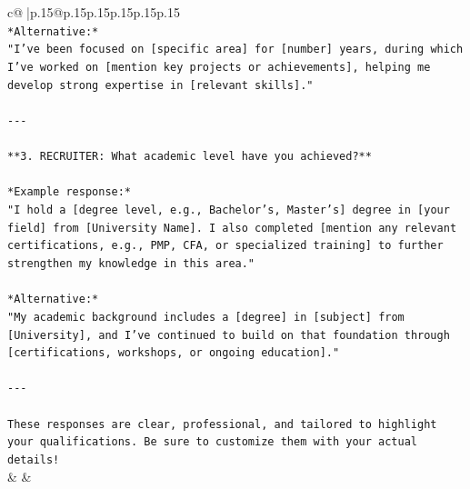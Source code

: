 \documentclass{article}
\begin{document}
{\begin{supertabular}{c@{$\;$}|p{.15\linewidth}@{}p{.15\linewidth}p{.15\linewidth}p{.15\linewidth}p{.15\linewidth}p{.15\linewidth}}
{{{\\ 
\texttt{*Alternative:*  } \\
\texttt{"I’ve been focused on {[}specific area{]} for {[}number{]} years, during which I’ve worked on {[}mention key projects or achievements{]}, helping me develop strong expertise in {[}relevant skills{]}."} \\
\\ 
\texttt{{-}{-}{-}} \\
\\ 
\texttt{**3. RECRUITER: What academic level have you achieved?**} \\
\\ 
\texttt{*Example response:*  } \\
\texttt{"I hold a {[}degree level, e.g., Bachelor’s, Master’s{]} degree in {[}your field{]} from {[}University Name{]}. I also completed {[}mention any relevant certifications, e.g., PMP, CFA, or specialized training{]} to further strengthen my knowledge in this area."} \\
\\ 
\texttt{*Alternative:*  } \\
\texttt{"My academic background includes a {[}degree{]} in {[}subject{]} from {[}University{]}, and I’ve continued to build on that foundation through {[}certifications, workshops, or ongoing education{]}."} \\
\\ 
\texttt{{-}{-}{-}} \\
\\ 
\texttt{These responses are clear, professional, and tailored to highlight your qualifications. Be sure to customize them with your actual details!} \\
            }
        }
    }
    & & \\ \\


\end{supertabular}}
\end{document}
